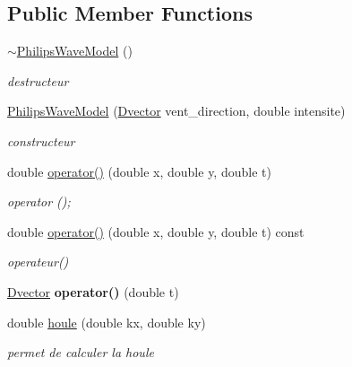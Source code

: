 \subsection*{Public Member Functions}
\begin{DoxyCompactItemize}
\item 
\hypertarget{classPhilipsWaveModel_a5fd60088cfeb35cdc529c4fadbaecf11}{\hyperlink{classPhilipsWaveModel_a5fd60088cfeb35cdc529c4fadbaecf11}{$\sim$\-Philips\-Wave\-Model} ()}\label{classPhilipsWaveModel_a5fd60088cfeb35cdc529c4fadbaecf11}

\begin{DoxyCompactList}\small\item\em destructeur \end{DoxyCompactList}\item 
\hyperlink{classPhilipsWaveModel_a9cb93d728be1a04bc0be2fcf5ce2f4e6}{Philips\-Wave\-Model} (\hyperlink{classDvector}{Dvector} vent\-\_\-direction, double intensite)
\begin{DoxyCompactList}\small\item\em constructeur \end{DoxyCompactList}\item 
\hypertarget{classPhilipsWaveModel_a2b6f3936d3294a056968a9ef37d051b0}{double \hyperlink{classPhilipsWaveModel_a2b6f3936d3294a056968a9ef37d051b0}{operator()} (double x, double y, double t)}\label{classPhilipsWaveModel_a2b6f3936d3294a056968a9ef37d051b0}

\begin{DoxyCompactList}\small\item\em operator (); \end{DoxyCompactList}\item 
\hypertarget{classPhilipsWaveModel_ac5d3959472111670ef05189a7bdeb379}{double \hyperlink{classPhilipsWaveModel_ac5d3959472111670ef05189a7bdeb379}{operator()} (double x, double y, double t) const }\label{classPhilipsWaveModel_ac5d3959472111670ef05189a7bdeb379}

\begin{DoxyCompactList}\small\item\em operateur() \end{DoxyCompactList}\item 
\hypertarget{classPhilipsWaveModel_a0c15316c6ebc65730f97b34d751faca8}{\hyperlink{classDvector}{Dvector} {\bfseries operator()} (double t)}\label{classPhilipsWaveModel_a0c15316c6ebc65730f97b34d751faca8}

\item 
double \hyperlink{classPhilipsWaveModel_aa61d74cb3a5495420eafac250b2961bb}{houle} (double kx, double ky)
\begin{DoxyCompactList}\small\item\em permet de calculer la houle \end{DoxyCompactList}\end{DoxyCompactItemize}
